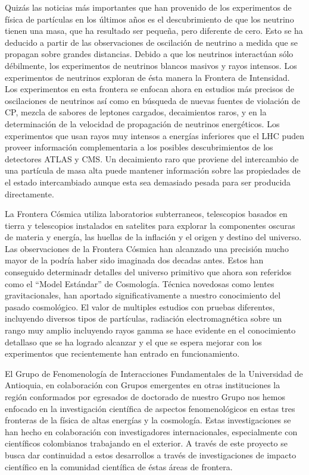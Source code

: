 Quizás las noticias más importantes que han provenido de los
experimentos de física de partículas en los últimos años es el
descubrimiento de que los neutrino tienen una masa, que ha resultado
ser pequeña, pero diferente de cero. Esto se ha deducido a partir de
las observaciones de oscilación de neutrino a medida que se propagan
sobre grandes distancias. Debido a que los neutrinos interactúan sólo
débilmente, los experimentos de neutrinos blancos masivos y rayos
intensos. Los experimentos de neutrinos exploran de ésta manera la
Frontera de Intensidad. Los experimentos en esta frontera se enfocan
ahora en estudios más precisos de oscilaciones de neutrinos así como
en búsqueda de nuevas fuentes de violación de CP, mezcla de sabores de
leptones cargados, decaimientos raros, y en la determinación de la
velocidad de propagación de neutrinos energéticos. Los experimentos
que usan rayos muy intensos a energías inferiores que el LHC puden
proveer información complementaria a los posibles descubrimientos de
los detectores ATLAS y CMS. Un decaimiento raro que proviene del
intercambio de una partícula de masa alta puede mantener información
sobre las propiedades de el estado intercambiado aunque esta sea
demasiado pesada para ser producida directamente.

La Frontera Cósmica utiliza laboratorios subterraneos, telescopios
basados en tierra y telescopios instalados en satelites para explorar
la componentes oscuras de materia y energía, las huellas de la
inflación y el origen y destino del universo. Las observaciones de la
Frontera Cósmica han alcanzado una precisión mucho mayor de la podría
haber sido imaginada dos decadas antes. Estos han conseguido
determinadr detalles del universo primitivo que ahora son referidos
como el ``Model Estándar'' de Cosmología. Técnica novedosas como
lentes gravitacionales, han aportado significativamente a nuestro
conocimiento del pasado cosmológico. El valor de multiples estudios
con pruebas diferentes, incluyendo diversos tipos de partículas,
radiación electromagnética sobre un rango muy amplio incluyendo rayos
gamma se hace evidente en el conocimiento detallaso que se ha logrado
alcanzar y el que se espera mejorar con los experimentos que
recientemente han entrado en funcionamiento.

El Grupo de Fenomenología de Interacciones Fundamentales de la
Universidad de Antioquia, en colaboración con Grupos emergentes en otras instituciones la región conformados
por egresados de doctorado de nuestro Grupo nos hemos  enfocado en la investigación científica
de aspectos fenomenológicos en estas tres fronteras de la física de
altas energías y la cosmología. Estas investigaciones se han hecho en 
colaboración con investigadores internacionales, especialmente con
científicos colombianos trabajando en el exterior. A través de este
proyecto se busca dar continuidad  a estos desarrollos a través de 
investigaciones de impacto científico en la comunidad científica de
éstas áreas de frontera. 

